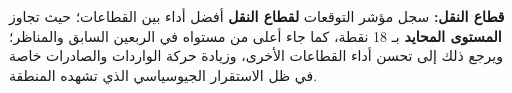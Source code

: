 \textbf{قطاع النقل:} سجل مؤشر التوقعات \textbf{لقطاع النقل} أفضل أداء بين القطاعات؛ حيث تجاوز \textbf{المستوى المحايد} بـ 18 نقطة، كما جاء أعلى من مستواه في الربعين السابق والمناظر؛ ويرجع ذلك إلى تحسن أداء القطاعات الأخرى، وزيادة حركة الواردات والصادرات خاصة في ظل الاستقرار الجيوسياسي الذي تشهده المنطقة.
